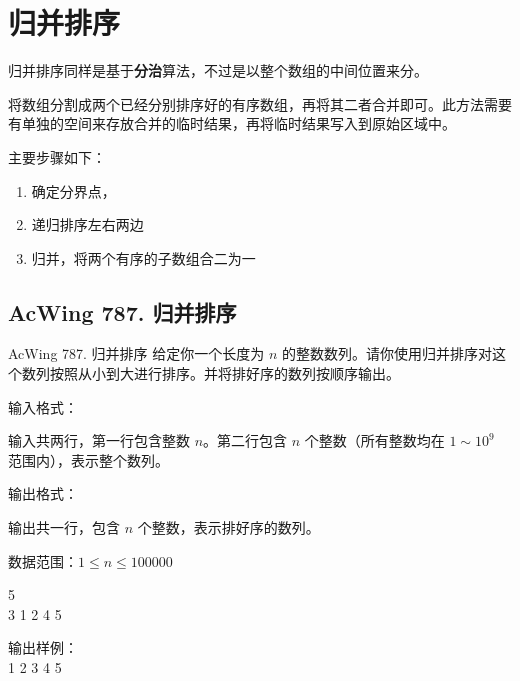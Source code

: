 \section{归并排序}
归并排序同样是基于\textbf{分治}算法，不过是以整个数组的中间位置来分。

将数组分割成两个已经分别排序好的有序数组，再将其二者合并即可。此方法需要有单独的空间来存放合并的临时结果，再将临时结果写入到原始区域中。

主要步骤如下：
\begin{enumerate}
    \item 确定分界点， 
    \item 递归排序左右两边
    \item 归并，将两个有序的子数组合二为一
\end{enumerate}

\subsection{AcWing 787. 归并排序}
\begin{titledbox}{AcWing 787. 归并排序}
    给定你一个长度为 $n$ 的整数数列。请你使用归并排序对这个数列按照从小到大进行排序。并将排好序的数列按顺序输出。

    输入格式：

    输入共两行，第一行包含整数 $n$。第二行包含 $n$ 个整数（所有整数均在 $1 \sim 10^9$ 范围内），表示整个数列。

    输出格式：

    输出共一行，包含 $n$ 个整数，表示排好序的数列。

    数据范围：$1 \le n \le 100000$

    \begin{inputblock}
        5 \\
        3 1 2 4 5
    \end{inputblock}%
    \begin{minipage}[t]{.5\textwidth}
        输出样例：\\
        1 2 3 4 5
    \end{minipage}
\end{titledbox}

